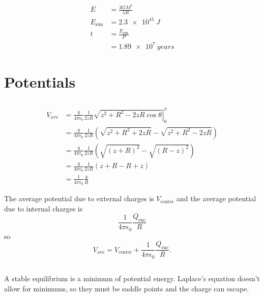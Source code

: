 \documentclass{article}
\newcommand{\ke}{\frac{1}{4 \pi \epsilon_0}}
\begin{document}
\begin{align*}
  E            & = \frac{3 G M^2}{5 R}    \\
  E_\text{sun} & = \qty{2.3e41}{J}        \\
  t            & = \frac{E_\text{sun}}{P} \\
               & = \qty{1.89e7}{years}
\end{align*}

\section{Potentials}

\subsection{}

\begin{align*}
  V_\text{ave} & = \frac{q}{4 \pi \epsilon_0} \frac{1}{2 z R} \left. \sqrt{z^2 + R^2 - 2 z R \cos \theta} \right|_0^\pi          \\
               & = \frac{q}{4 \pi \epsilon_0} \frac{1}{2 z R} \left( \sqrt{z^2 + R^2 + 2 z R} - \sqrt{z^2 + R^2 - 2 z R} \right) \\
               & = \frac{q}{4 \pi \epsilon_0} \frac{1}{2 z R} \left( \sqrt{(z + R)^2} - \sqrt{(R - z)^2} \right)                 \\
               & = \frac{q}{4 \pi \epsilon_0} \frac{1}{2 z R} (z + R - R + z)                                                    \\
               & = \frac{1}{4 \pi \epsilon_0} \frac{q}{R}
\end{align*}

The average potential due to external charges is $V_\text{center}$ and the average potential due to internal charges is \[\ke \frac{Q_\text{enc}}{R}\] so \[V_\text{ave} = V_\text{center} + \ke \frac{Q_\text{enc}}{R}.\]

\subsection{}

A stable equilibrium is a minimum of potential energy. Laplace's equation doesn't allow for minimums, so they must be saddle points and the charge can escape.

\subsection{}
\end{document}

